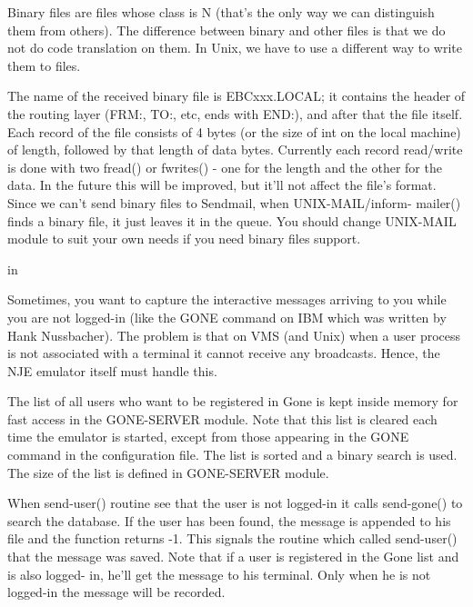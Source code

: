 Binary  files  are files whose class is N (that's the only way we can
distinguish them from others). The difference between binary  and  other
files is that we do not do code translation on them. In Unix, we have to
use a different way to write them to files.

The name of the received binary file is EBCxxx.LOCAL; it contains the
header  of the routing layer (FRM:, TO:, etc, ends with END:), and after
that the file itself. Each record of the file consists of  4  bytes  (or
the size of int on the local machine) of length, followed by that length
of data bytes. Currently each record read/write is done with two fread()
or  fwrites()  -  one  for the length and the other for the data. In the
future this will be improved, but it'll not affect the file's format.
Since we can't send binary files to Sendmail, when  UNIX-MAIL/inform-
mailer() finds a binary file, it just leaves it in the queue. You should
change UNIX-MAIL module to suit your own needs if you need binary  files
support.

 in

Sometimes,  you  want to capture the interactive messages arriving to
you while you are not logged-in (like the GONE command on IBM which  was
written  by Hank Nussbacher). The problem is that on VMS (and Unix) when
a user process is not associated with a terminal it cannot  receive  any
broadcasts. Hence, the NJE emulator itself must handle this.

The  list  of  all  users  who  want to be registered in Gone is kept
inside memory for fast access in the GONE-SERVER module. Note that  this
list  is  cleared  each  time the emulator is started, except from those
appearing in the GONE command in the configuration  file.  The  list  is
sorted  and  a binary search is used. The size of the list is defined in
GONE-SERVER module.

When send-user() routine see that the user is not logged-in it  calls
send-gone()  to  search  the  database.  If the user has been found, the
message is appended to his  file  and  the  function  returns  -1.  This
signals the routine which called send-user() that the message was saved.
Note that if a user is registered in the Gone list and is  also  logged-
in, he'll get the message to his terminal. Only when he is not logged-in
the message will be recorded.

\vfill\eject


